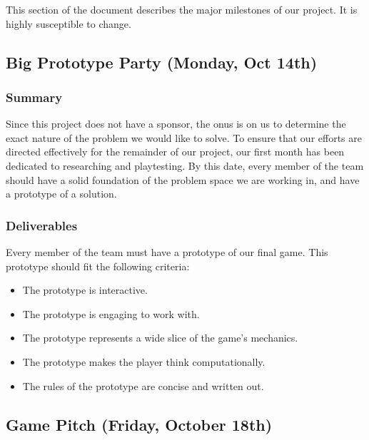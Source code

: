 This section of the document describes the major milestones of our project. It
is highly susceptible to change.

\subsection{Big Prototype Party (Monday, Oct 14th)}

\subsubsection*{Summary}
Since this project does not have a sponsor, the onus is on us to determine the
exact nature of the problem we would like to solve. To ensure that our efforts
are directed effectively for the remainder of our project, our first month has
been dedicated to researching and playtesting. By this date, every member of the
team should have a solid foundation of the problem space we are working in, and
have a prototype of a solution.

\subsubsection*{Deliverables}
Every member of the team must have a prototype of our final game. This prototype
should fit the following criteria:
\begin{itemize}
	\item The prototype is interactive.
	\item The prototype is engaging to work with.
	\item The prototype represents a wide slice of the game’s mechanics.
	\item The prototype makes the player think computationally.
	\item The rules of the prototype are concise and written out.
\end{itemize}

\subsection{Game Pitch (Friday, October 18th)}

